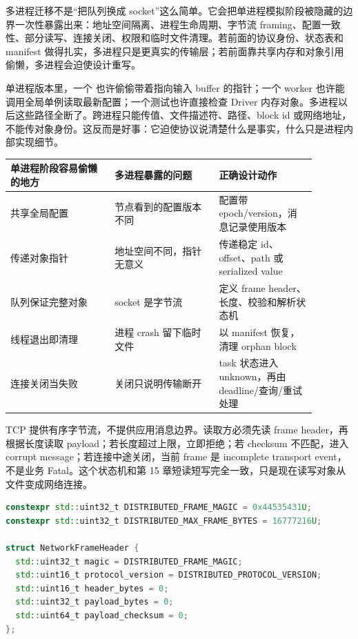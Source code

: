 多进程迁移不是“把队列换成 socket”这么简单。它会把单进程模拟阶段被隐藏的边界一次性暴露出来：地址空间隔离、进程生命周期、字节流 framing、配置一致性、部分读写、连接关闭、权限和临时文件清理。若前面的协议身份、状态表和 manifest 做得扎实，多进程只是更真实的传输层；若前面靠共享内存和对象引用偷懒，多进程会迫使设计重写。

单进程版本里，一个  也许偷偷带着指向输入 buffer 的指针；一个 worker 也许能调用全局单例读取最新配置；一个测试也许直接检查 Driver 内存对象。多进程以后这些路径全断了。跨进程只能传值、文件描述符、路径、block id 或网络地址，不能传对象身份。这反而是好事：它迫使协议说清楚什么是事实，什么只是进程内部实现细节。

\begin{center}
\begin{tabular}{p{0.30\linewidth}p{0.30\linewidth}p{0.28\linewidth}}
\toprule
单进程阶段容易偷懒的地方 & 多进程暴露的问题 & 正确设计动作 \\
\midrule
共享全局配置 & 节点看到的配置版本不同 & 配置带 epoch/version，消息记录使用版本 \\
传递对象指针 & 地址空间不同，指针无意义 & 传递稳定 id、offset、path 或 serialized value \\
队列保证完整对象 & socket 是字节流 & 定义 frame header、长度、校验和解析状态机 \\
线程退出即清理 & 进程 crash 留下临时文件 & 以 manifest 恢复，清理 orphan block \\
连接关闭当失败 & 关闭只说明传输断开 & task 状态进入 unknown，再由 deadline/查询/重试处理 \\
\bottomrule
\end{tabular}
\end{center}

TCP 提供有序字节流，不提供应用消息边界。读取方必须先读 frame header，再根据长度读取 payload；若长度超过上限，立即拒绝；若 checksum 不匹配，进入 corrupt message；若连接中途关闭，当前 frame 是 incomplete transport event，不是业务 Fatal。这个状态机和第 15 章短读短写完全一致，只是现在读写对象从文件变成网络连接。

\begin{lstlisting}[language=C++,caption={网络 frame header 的示例形态}]
constexpr std::uint32_t DISTRIBUTED_FRAME_MAGIC = 0x44535431U;
constexpr std::uint32_t DISTRIBUTED_MAX_FRAME_BYTES = 16777216U;

struct NetworkFrameHeader {
  std::uint32_t magic = DISTRIBUTED_FRAME_MAGIC;
  std::uint16_t protocol_version = DISTRIBUTED_PROTOCOL_VERSION;
  std::uint16_t header_bytes = 0;
  std::uint32_t payload_bytes = 0;
  std::uint64_t payload_checksum = 0;
};
\end{lstlisting}

